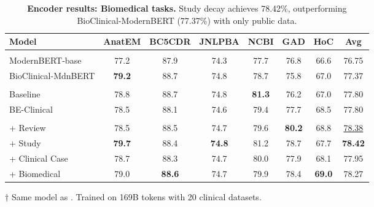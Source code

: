 \begin{table}[t]
\centering
\small
\setlength{\tabcolsep}{5pt}
\begin{threeparttable}[b]
\begin{tabular}{l S[table-format=2.1] S[table-format=2.1] S[table-format=2.1] S[table-format=2.1] S[table-format=2.1] S[table-format=2.1] S[table-format=2.1]}
\toprule
\textbf{Model} & {\textbf{AnatEM}} & {\textbf{BC5CDR}} & {\textbf{JNLPBA}} & {\textbf{NCBI}} & {\textbf{GAD}} & {\textbf{HoC}} & {\textbf{Avg}} \\
\midrule
{}
 \\[1pt]
ModernBERT-base & 77.2 & 87.9 & 74.3 & 77.7 & 76.8 & 66.6 & 76.75 \\
BioClinical-MdnBERT\tnote{$\dagger$} & \bfseries 79.2 & 88.7 & 74.8 & 78.7 & 75.8 & 67.0 & 77.37 \\
\midrule
{}
 \\[1pt]
Baseline & 78.8 & 88.7 & 74.8 & \bfseries 81.3 & 76.2 & 67.0 & 77.80 \\
BE-Clinical & 78.5 & 88.1 & 74.6 & 79.4 & 77.7 & 68.5 & 77.80 \\
\midrule
{}
 \\[1pt]
\quad + Review & 78.5 & 88.5 & 74.7 & 79.6 & \bfseries 80.2 & 68.8 & \underline{78.38} \\
\quad + Study & \bfseries 79.7 & 88.4 & \bfseries 74.8 & 81.2 & 78.7 & 67.7 & \bfseries 78.42 \\
\quad + Clinical Case & 78.7 & 88.3 & 74.7 & 80.0 & 77.9 & 68.1 & 77.95 \\
\quad + Biomedical & 79.0 & \bfseries 88.6 & 74.7 & 79.9 & 78.4 & \bfseries 69.0 & 78.27 \\
\bottomrule
\end{tabular}
\begin{tablenotes}
  \small
  \item[$\dagger$] Same model as . Trained on 169B tokens with 20 clinical datasets.
\end{tablenotes}
\end{threeparttable}
\caption{\textbf{Encoder results: Biomedical tasks.} Study decay achieves 78.42\%, outperforming BioClinical-ModernBERT (77.37\%) with only public data.}
\label{tab:encoder-biomed}
\end{table}

